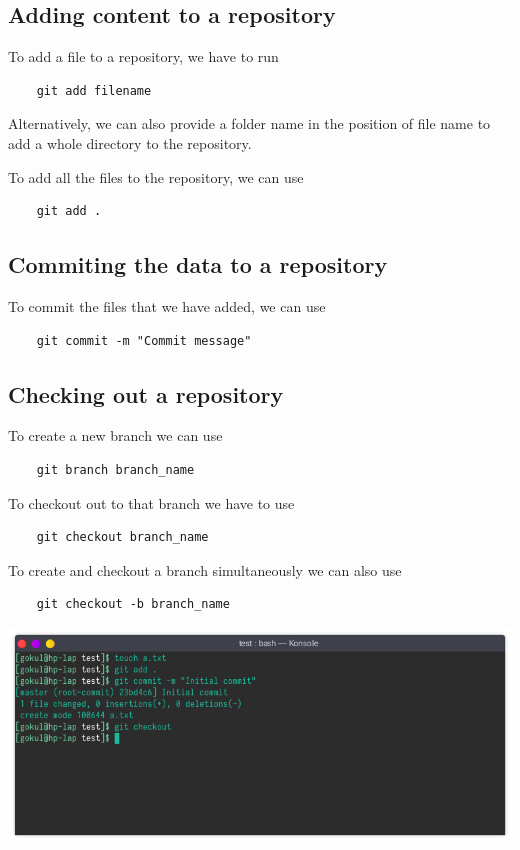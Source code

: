 \documentclass{article}
\begin{document}
\newpage
\subsection{Adding content to a repository}
To add a file to a repository, we have to run \begin{verbatim}
	git add filename
\end{verbatim}
Alternatively, we can also provide a folder name in the position of file
name to add a whole directory to the repository.

To add all the files to the repository, we can use
\begin{verbatim}
	git add .
\end{verbatim}

\newpage
\subsection{Commiting the data to a repository}
To commit the files that we have added, we can use\begin{verbatim}
	git commit -m "Commit message"
\end{verbatim}


\subsection{Checking out a repository}
To create a new branch we can use \begin{verbatim}
	git branch branch_name
\end{verbatim}
To checkout out to that branch we have to use \begin{verbatim}
	git checkout branch_name
\end{verbatim}
To create and checkout a branch simultaneously we can also use \begin{verbatim}
 	git checkout -b branch_name
\end{verbatim}
\includegraphics[width=1.2\textwidth]{img/p27/ss2.png}
\newpage
\end{document}
